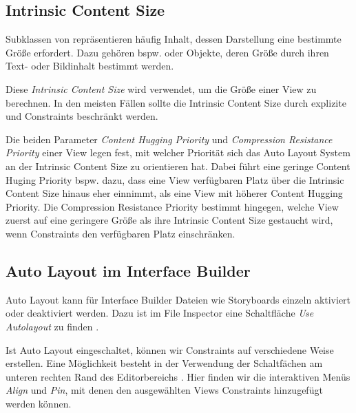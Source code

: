 \documentclass[parskip=half, final]{scrreprt}
\begin{document}
\subsection{Intrinsic Content Size}

Subklassen von  repräsentieren häufig Inhalt, dessen Darstellung eine bestimmte Größe erfordert. Dazu gehören bspw.  oder  Objekte, deren Größe durch ihren Text- oder Bildinhalt bestimmt werden.

Diese \emph{Intrinsic Content Size} wird verwendet, um die Größe einer View zu berechnen. In den meisten Fällen sollte die Intrinsic Content Size  durch explizite  und  Constraints beschränkt werden.

Die beiden Parameter \emph{Content Hugging Priority} und \emph{Compression Resistance Priority} einer View legen fest, mit welcher Priorität sich das Auto Layout System an der Intrinsic Content Size zu orientieren hat. Dabei führt eine geringe Content Huging Priority bspw. dazu, dass eine View verfügbaren Platz über die Intrinsic Content Size hinaus eher einnimmt, als eine View mit höherer Content Hugging Priority. Die Compression Resistance Priority bestimmt hingegen, welche View zuerst auf eine geringere Größe als ihre Intrinsic Content Size gestaucht wird, wenn Constraints den verfügbaren Platz einschränken.

\subsection{Auto Layout im Interface Builder}

Auto Layout kann für Interface Builder Dateien wie Storyboards einzeln aktiviert oder deaktiviert werden. Dazu ist im File Inspector eine Schaltfläche \emph{Use Autolayout} zu finden .


Ist Auto Layout eingeschaltet, können wir Constraints auf verschiedene Weise erstellen. Eine Möglichkeit besteht in der Verwendung der Schaltfächen am unteren rechten Rand des Editorbereichs . Hier finden wir die interaktiven Menüs \emph{Align} und \emph{Pin}, mit denen den ausgewählten Views Constraints hinzugefügt werden können.
\end{document}
